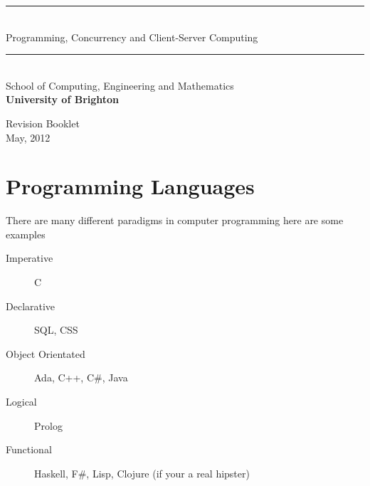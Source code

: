 \documentclass[a4paper,oneside]{report}
\newcommand{\HRuleLight}{\rule{\linewidth}{0.1mm}}
\begin{document}
%
%
\begin{titlepage}
\begin{center}

\HRuleLight\\[0.5cm]

\Huge Programming, Concurrency and Client-Server Computing

\HRuleLight\\[0.2cm]

\large School of Computing, Engineering and Mathematics\\ \textbf{University of Brighton}

\vfill
\huge Revision Booklet\\
\large May, 2012\\

\end{center}
\end{titlepage}


%
%
{
	\renewcommand\thepage{}
	\setcounter{tocdepth}{3}
	\tableofcontents
	\clearpage
}

\setcounter{page}{1}


%
%

\chapter{Programming Languages}

There are many different paradigms in computer programming here are some examples


\begin{description}

\item[Imperative] C
\item[Declarative] SQL, CSS
\item[Object Orientated] Ada, C++, C\#, Java
\item[Logical] Prolog
\item[Functional] Haskell, F\#, Lisp, Clojure (if your a real hipster)

\end{description}
\end{document}
